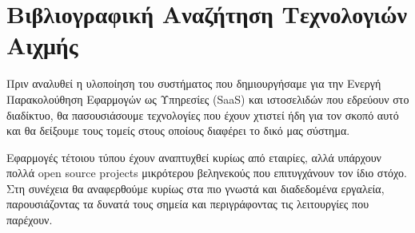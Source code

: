 \chapter{Βιβλιογραφική Αναζήτηση Τεχνολογιών Αιχμής}
\label{chapter:state_of_the_art}

Πριν αναλυθεί η υλοποίηση του συστήματος που δημιουργήσαμε για την Ενεργή Παρακολούθηση
Eφαρμογών ως Υπηρεσίες (SaaS) και ιστοσελιδών που εδρεύουν στο διαδίκτυο, θα πασουσιάσουμε τεχνολογίες
που έχουν χτιστεί ήδη για τον σκοπό αυτό και θα δείξουμε τους τομείς στους οποίους
διαφέρει το δικό μας σύστημα.

Εφαρμογές τέτοιου τύπου έχουν αναπτυχθεί κυρίως από εταιρίες, αλλά υπάρχουν πολλά open source
projects μικρότερου βεληνεκούς που επιτυγχάνουν τον ίδιο στόχο. Στη συνέχεια θα αναφερθούμε κυρίως στα
πιο γνωστά και διαδεδομένα εργαλεία, παρουσιάζοντας τα δυνατά τους σημεία και περιγράφοντας τις λειτουργίες
που παρέχουν.

